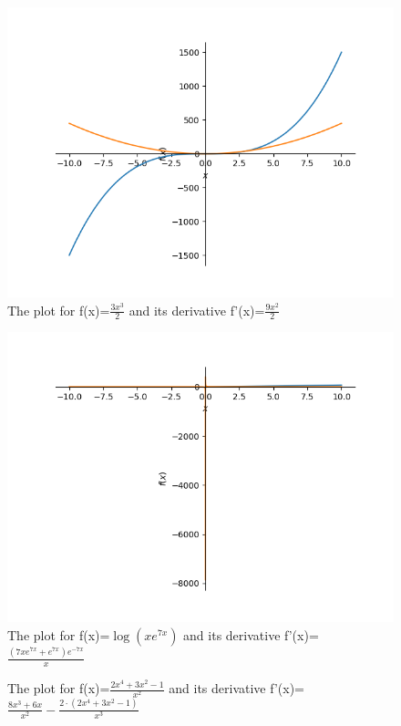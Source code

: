 \documentclass{article}
\begin{document}
\begin{figure}
\end{figure}\begin{figure}
\caption{The plot for f(x)=$\frac{3 x^{3}}{2}$ and its derivative f'(x)=$\frac{9 x^{2}}{2}$}
\centering
\includegraphics{plot_8}
\end{figure}\begin{figure}
\caption{The plot for f(x)=$\log{\left(x e^{7 x} \right)}$ and its derivative f'(x)=$\frac{\left(7 x e^{7 x} + e^{7 x}\right) e^{- 7 x}}{x}$}
\centering
\includegraphics{plot_9}
\end{figure}\begin{figure}
\caption{The plot for f(x)=$\frac{2 x^{4} + 3 x^{2} - 1}{x^{2}}$ and its derivative f'(x)=$\frac{8 x^{3} + 6 x}{x^{2}} - \frac{2 \cdot \left(2 x^{4} + 3 x^{2} - 1\right)}{x^{3}}$}

\end{figure}
\end{document}
